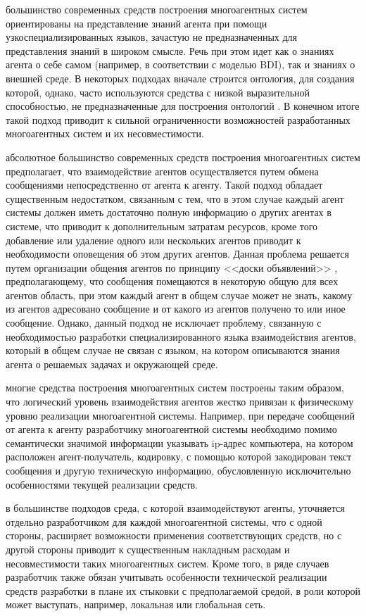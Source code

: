 \begin{SCn}
{\begin{scnitemize}
\item большинство современных средств построения многоагентных систем ориентированы на представление знаний агента при помощи узкоспециализированных языков, зачастую не предназначенных для представления знаний в широком смысле. Речь при этом идет как о знаниях агента о себе самом (например, в соответствии с моделью BDI), так и знаниях о внешней среде. В некоторых подходах вначале строится онтология, для создания которой, однако, часто используются средства с низкой выразительной способностью, не предназначенные для построения онтологий \cite{Evertsz2004,JADE2017}. В конечном итоге такой подход приводит к сильной ограниченности возможностей разработанных многоагентных систем и их несовместимости.
\item абсолютное большинство современных средств построения многоагентных систем предполагает, что взаимодействие агентов осуществляется путем обмена сообщениями непосредственно от агента к агенту. Такой подход обладает существенным недостатком, связанным с тем, что в этом случае каждый агент системы должен иметь достаточно полную информацию о других агентах в системе, что приводит к дополнительным затратам ресурсов, кроме того добавление или удаление одного или нескольких агентов приводит к необходимости оповещения об этом других агентов. Данная проблема решается путем организации общения агентов по принципу <<доски объявлений>> \cite{Jagannathan1989}, предполагающему, что сообщения помещаются в некоторую общую для всех агентов область, при этом каждый агент в общем случае может не знать, какому из агентов адресовано сообщение и от какого из агентов получено то или иное сообщение. Однако, данный подход не исключает проблему, связанную с необходимостью разработки специализированного языка взаимодействия агентов, который в общем случае не связан с языком, на котором описываются знания агента о решаемых задачах и окружающей среде.
\item многие средства построения многоагентных систем построены таким образом, что логический уровень взаимодействия агентов жестко привязан к физическому уровню реализации многоагентной системы. Например, при передаче сообщений от агента к агенту разработчику многоагентной системы необходимо помимо семантически значимой информации указывать ip-адрес компьютера, на котором расположен агент-получатель, кодировку, с помощью которой закодирован текст сообщения и другую техническую информацию, обусловленную исключительно особенностями текущей реализации средств.
\item в большинстве подходов среда, с которой взаимодействуют агенты, уточняется отдельно разработчиком для каждой многоагентной системы, что с одной стороны, расширяет возможности применения соответствующих средств, но с другой стороны приводит к существенным накладным расходам и несовместимости таких многоагентных систем. Кроме того, в ряде случаев разработчик также обязан учитывать особенности технической реализации средств разработки в плане их стыковки с предполагаемой средой, в роли которой может выступать, например, локальная или глобальная сеть.
\end{scnitemize}}

\scnendstruct

\end{SCn}